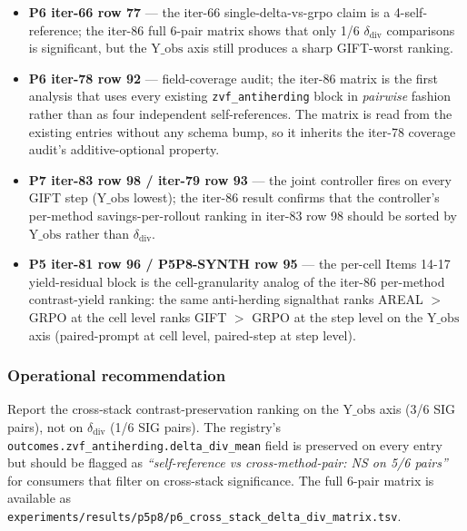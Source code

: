 \begin{itemize}
\item \textbf{P6 iter-66 row 77} --- the iter-66 single-delta-vs-grpo
      claim is a 4-self-reference; the iter-86 full 6-pair matrix
      shows that only 1/6 $\delta_{\mathrm{div}}$ comparisons is
      significant, but the $\mathrm{Y\_obs}$ axis still produces a
      sharp GIFT-worst ranking.
\item \textbf{P6 iter-78 row 92} --- field-coverage audit; the iter-86
      matrix is the first analysis that uses every existing
      \texttt{zvf\_antiherding} block in \emph{pairwise} fashion rather
      than as four independent self-references. The matrix is read
      from the existing entries without any schema bump, so it
      inherits the iter-78 coverage audit's additive-optional property.
\item \textbf{P7 iter-83 row 98 / iter-79 row 93} --- the joint
      controller fires on every GIFT step ($\mathrm{Y\_obs}$ lowest);
      the iter-86 result confirms that the controller's per-method
      savings-per-rollout ranking in iter-83 row 98 should be
      sorted by $\mathrm{Y\_obs}$ rather than $\delta_{\mathrm{div}}$.
\item \textbf{P5 iter-81 row 96 / P5P8-SYNTH row 95} --- the per-cell
      Items 14-17 yield-residual block is the cell-granularity analog
      of the iter-86 per-method contrast-yield ranking: the same
      anti-herding signalthat ranks AREAL $>$ GRPO at the cell level
      ranks GIFT $>$ GRPO at the step level on the $\mathrm{Y\_obs}$
      axis (paired-prompt at cell level, paired-step at step level).
\end{itemize}

\subsubsection{Operational recommendation}

Report the cross-stack contrast-preservation ranking on the
$\mathrm{Y\_obs}$ axis (3/6 SIG pairs), not on $\delta_{\mathrm{div}}$
(1/6 SIG pairs). The registry's
\texttt{outcomes.zvf\_antiherding.delta\_div\_mean} field is preserved
on every entry but should be flagged as
\textit{``self-reference vs cross-method-pair: NS on 5/6 pairs''} for
consumers that filter on cross-stack significance.
The full 6-pair matrix is available as
\texttt{experiments/results/p5p8/p6\_cross\_stack\_delta\_div\_matrix.tsv}.

